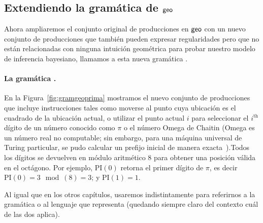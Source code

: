 \subsection{Extendiendo la gramática de ${\sf geo}$}


Ahora ampliaremos el conjunto original de producciones en ${\sf geo}$ con un nuevo conjunto de producciones que también pueden expresar regularidades pero que no están relacionadas con ninguna intuición geométrica para probar nuestro modelo de inferencia bayesiano, llamamos a esta nueva gramática \gramgeoprima.


\paragraph{La gramática \gramgeoprima.}

En la Figura~\ref{fig:gramgeoprima} mostramos el nuevo conjunto de producciones que incluye instrucciones tales como moverse al punto cuya ubicación es el cuadrado de la ubicación actual, o utilizar el punto actual $i$ para seleccionar el $i^\text{th}$dígito de un número conocido como $\pi$ o el número Omega de Chaitin (Omega es un número real no computable; sin embargo, para una máquina universal de Turing particular, se pudo calcular un prefijo inicial de manera exacta~\cite{calude2002computing}).Todos los dígitos se devuelven en módulo aritmético 8 para obtener una posición válida en el octágono. Por ejemplo, $\textrm{PI}(0)$ retorna el primer dígito de $\pi$, es decir $\textrm{PI}(0)= 3 \mod({8}) = 3$; y $\textrm{PI}(1) = 1$.


Al igual que en los otros capítulos, usaremos indistintamente \gramgeoprima para referirnos a la gramática o al lenguaje que representa (quedando siempre claro del contexto cuál de las dos aplica).


